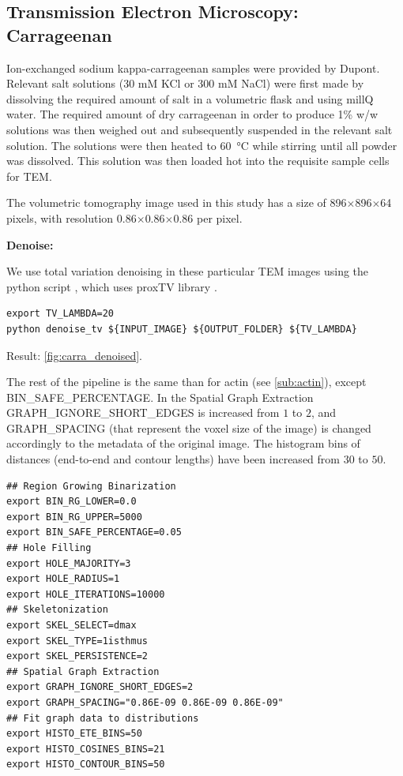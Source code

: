 \subsection{Transmission Electron Microscopy: Carrageenan}%
\label{sub:carrageenan}


Ion-exchanged sodium kappa-carrageenan samples were provided by Dupont. Relevant salt solutions (30 mM KCl  or 300 mM NaCl) were first made by dissolving the required amount of salt in a volumetric flask and using millQ water. The required amount of dry carrageenan in order to produce 1\% w/w solutions was then weighed out and subsequently suspended in the relevant salt solution. The solutions were then heated to \SI{60}{\degreeCelsius} while stirring until all powder was dissolved. This solution was then loaded hot into the requisite sample cells for \gls{TEM}.

The volumetric tomography image used in this study has a size of 896$\times$896$\times$64 pixels, with resolution 0.86$\times$0.86$\times$0.86 \nm per pixel.

\textbf{Denoise:}

We use total variation denoising in these particular TEM images using the python script  \cite{phcerdan_denoise_tv_2018}, which uses proxTV library \cite{barbero_modular_2014}.

\begin{verbatim}
export TV_LAMBDA=20
python denoise_tv ${INPUT_IMAGE} ${OUTPUT_FOLDER} ${TV_LAMBDA}
\end{verbatim}

Result: \autoref{fig:carra_denoised}.

The rest of the pipeline is the same than for actin (see \autoref{sub:actin}), except BIN\_SAFE\_PERCENTAGE.
In the Spatial Graph Extraction GRAPH\_IGNORE\_SHORT\_EDGES is increased from $1$ to $2$,
and GRAPH\_SPACING (that represent the voxel size of the image) is changed accordingly to the metadata of the original image.
The histogram bins of distances (end-to-end and contour lengths) have been increased from $30$ to $50$.

\begin{verbatim}
## Region Growing Binarization
export BIN_RG_LOWER=0.0
export BIN_RG_UPPER=5000
export BIN_SAFE_PERCENTAGE=0.05
## Hole Filling
export HOLE_MAJORITY=3
export HOLE_RADIUS=1
export HOLE_ITERATIONS=10000
## Skeletonization
export SKEL_SELECT=dmax
export SKEL_TYPE=1isthmus
export SKEL_PERSISTENCE=2
## Spatial Graph Extraction
export GRAPH_IGNORE_SHORT_EDGES=2
export GRAPH_SPACING="0.86E-09 0.86E-09 0.86E-09"
## Fit graph data to distributions
export HISTO_ETE_BINS=50
export HISTO_COSINES_BINS=21
export HISTO_CONTOUR_BINS=50
\end{verbatim}

